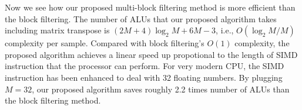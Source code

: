 Now we see how our proposed multi-block filtering method is more efficient than the block filtering. The number of ALUs that our proposed algorithm takes
including matrix transpose is $(2M{+}4)\log_2M{+}6M{-}3$, i.e., $O(\log_2M/M)$ complexity per sample. Compared with block filtering's $O(1)$ complexity,
the proposed algorithm achieves a linear speed up propotional to the length of SIMD instruction that the processor can perform.
For very modern CPU, the SIMD instruction has been enhanced to deal with 32 floating numbers. By plugging $M{=}32$, our proposed algorithm saves roughly 2.2
times number of ALUs than the block filtering method.













